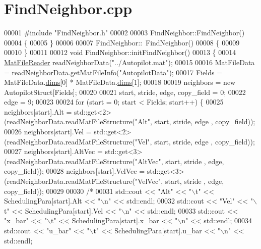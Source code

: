 \hypertarget{_find_neighbor_8cpp_source}{}\section{Find\+Neighbor.\+cpp}
\label{_find_neighbor_8cpp_source}

\begin{DoxyCode}
00001 \textcolor{preprocessor}{#include "FindNeighbor.h"}
00002 
00003 FindNeighbor::FindNeighbor()
00004 \{
00005 \}
00006 
00007 FindNeighbor::~FindNeighbor()
00008 \{
00009     
00010 \}
00011 
00012 \textcolor{keywordtype}{void} FindNeighbor::initFindNeighbor()
00013 \{
00014     \hyperlink{class_mat_file_reader}{MatFileReader} readNeighborData(\textcolor{stringliteral}{"../Autopilot.mat"});
00015 
00016     MatFileData = readNeighborData.getMatFileInfo(\textcolor{stringliteral}{"AutopilotData"});
00017     Fields = MatFileData.\hyperlink{group___m_a_t_a8e01234e1c862ce3472bb37f5a09b92c}{dims}[0] * MatFileData.\hyperlink{group___m_a_t_a8e01234e1c862ce3472bb37f5a09b92c}{dims}[1];
00018 
00019     neighbors = \textcolor{keyword}{new} AutopilotStruct[Fields];
00020 
00021     start, stride, edge, copy\_field = 0;
00022     edge = 9;
00023 
00024     \textcolor{keywordflow}{for} (start = 0; start < Fields; start++) \{
00025         neighbors[start].Alt = std::get<2>(readNeighborData.readMatFileStructure(\textcolor{stringliteral}{"Alt"}, start, stride, edge
      , copy\_field));
00026         neighbors[start].Vel = std::get<2>(readNeighborData.readMatFileStructure(\textcolor{stringliteral}{"Vel"}, start, stride, edge
      , copy\_field));
00027         neighbors[start].AltVec = std::get<3>(readNeighborData.readMatFileStructure(\textcolor{stringliteral}{"AltVec"}, start, stride
      , edge, copy\_field));
00028         neighbors[start].VelVec = std::get<3>(readNeighborData.readMatFileStructure(\textcolor{stringliteral}{"VelVec"}, start, stride
      , edge, copy\_field));
00029 
00030         \textcolor{comment}{/*}
00031 \textcolor{comment}{        std::cout << "Alt" << "\(\backslash\)t" << SchedulingPara[start].Alt << "\(\backslash\)n" << std::endl;}
00032 \textcolor{comment}{        std::cout << "Vel" << "\(\backslash\)t" << SchedulingPara[start].Vel << "\(\backslash\)n" << std::endl;}
00033 \textcolor{comment}{        std::cout << "x\_bar" << "\(\backslash\)t" << SchedulingPara[start].x\_bar << "\(\backslash\)n" << std::endl;}
00034 \textcolor{comment}{        std::cout << "u\_bar" << "\(\backslash\)t" << SchedulingPara[start].u\_bar << "\(\backslash\)n" << std::endl;}

\end{DoxyCode}
